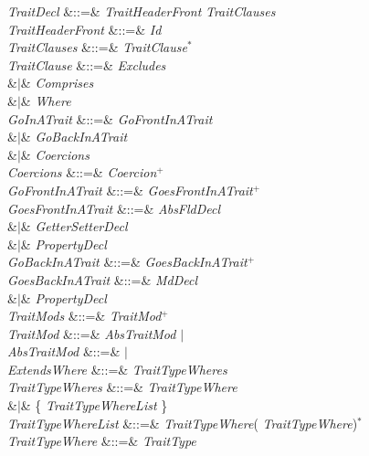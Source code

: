 \begin{Grammar}
\emph{TraitDecl}  &::=& 
\emph{TraitHeaderFront} \emph{TraitClauses}  
 \\

\emph{TraitHeaderFront} &::=&
 \emph{Id}   \\

\emph{TraitClauses} &::=& \emph{TraitClause}$^*$\\

\emph{TraitClause} &::=& \emph{Excludes} \\
&$|$& \emph{Comprises} \\
&$|$& \emph{Where} \\

\emph{GoInATrait}
&::=& 
\emph{GoFrontInATrait} \\
&$|$& 
\emph{GoBackInATrait} \\
&$|$& \emph{Coercions}\\

\emph{Coercions} &::=& \emph{Coercion}$^+$\\

\emph{GoFrontInATrait} &::=& \emph{GoesFrontInATrait}$^+$\\

\emph{GoesFrontInATrait}
&::=& \emph{AbsFldDecl} \\
&$|$& \emph{GetterSetterDecl} \\
&$|$& \emph{PropertyDecl} \\

\emph{GoBackInATrait} &::=& \emph{GoesBackInATrait}$^+$\\

\emph{GoesBackInATrait}
&::=& \emph{MdDecl} \\
&$|$& \emph{PropertyDecl} \\

\emph{TraitMods} &::=& \emph{TraitMod}$^+$\\

\emph{TraitMod} &::=& \emph{AbsTraitMod} $|$ \\

\emph{AbsTraitMod} &::=&  $|$ \\

\emph{ExtendsWhere} &::=&  \emph{TraitTypeWheres} \\

\emph{TraitTypeWheres} &::=& \emph{TraitTypeWhere} \\
&$|$& \{ \emph{TraitTypeWhereList} \} \\

\emph{TraitTypeWhereList} &::=& \emph{TraitTypeWhere}(\EXP{,} \emph{TraitTypeWhere})$^*$ \\

\emph{TraitTypeWhere} &::=& \emph{TraitType} \\
\end{Grammar}

